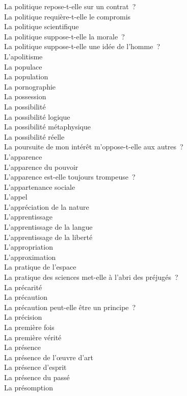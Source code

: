\documentclass[a4paper,12pt]{article}
\begin{document}
La politique repose-t-elle sur un contrat ? \\
La politique requière-t-elle le compromis \\
La politique scientifique \\
La politique suppose-t-elle la morale ? \\
La politique suppose-t-elle une idée de l'homme ? \\
L'apolitisme \\
La populace \\
La population \\
La pornographie \\
La possession \\
La possibilité \\
La possibilité logique \\
La possibilité métaphysique \\
La possibilité réelle \\
La poursuite de mon intérêt m'oppose-t-elle aux autres ? \\
L'apparence \\
L'apparence du pouvoir \\
L'apparence est-elle toujours trompeuse ? \\
L'appartenance sociale \\
L'appel \\
L'appréciation de la nature \\
L'apprentissage \\
L'apprentissage de la langue \\
L'apprentissage de la liberté \\
L'appropriation \\
L'approximation \\
La pratique de l'espace \\
La pratique des sciences met-elle à l'abri des préjugés ? \\
La précarité \\
La précaution \\
La précaution peut-elle être un principe ? \\
La précision \\
La première fois \\
La première vérité \\
La présence \\
La présence de l'œuvre d'art \\
La présence d'esprit \\
La présence du passé \\
La présomption \\
\end{document}
